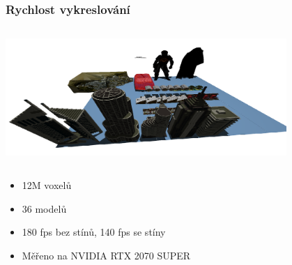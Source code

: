 \documentclass[10pt,xcolor=pdflatex,hyperref={unicode},aspectratio=169]{beamer}
\begin{document}
\begin{frame}\frametitle{Rychlost vykreslování}
    \begin{column}{\textwidth}
        \begin{center}
            \includegraphics[width=0.8\textwidth]{img/big_scene.png}
        \end{center}
    \end{column}
    \begin{itemize}
        \item 12M voxelů
        \item 36 modelů
        \item 180 fps bez stínů, 140 fps se stíny
        \item Měřeno na NVIDIA RTX 2070 SUPER
    \end{itemize}
\end{frame}

\end{document}
